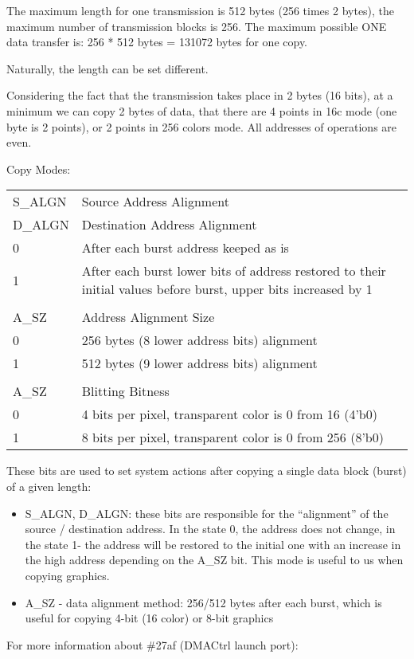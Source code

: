The maximum length for one transmission is 512 bytes (256 times 2
bytes), the maximum number of transmission blocks is 256. The maximum
possible ONE data transfer is: 256 * 512 bytes = 131072 bytes for one
copy.

Naturally, the length can be set different.

Considering the fact that the transmission takes place in 2 bytes (16
bits), at a minimum we can copy 2 bytes of data, that there are 4
points in 16c mode (one byte is 2 points), or 2 points in 256 colors
mode. All addresses of operations are even.

Copy Modes:
\begin{table}
\begin{tabular}{lp{4in}}
S\_ALGN & Source Address Alignment\\
D\_ALGN & Destination Address Alignment\\
0 & After each burst address keeped as is\\
1 & After each burst lower bits of address restored to their initial
values before burst, upper bits increased by 1\\
&\\
A\_SZ & Address Alignment Size\\
0 & 256 bytes (8 lower address bits) alignment\\
1 & 512 bytes (9 lower address bits) alignment\\
&\\
A\_SZ & Blitting Bitness\\
0 & 4 bits per pixel, transparent color is 0 from 16 (4'b0)\\
1 & 8 bits per pixel, transparent color is 0 from 256 (8'b0)\\
\end{tabular}
\end{table}
These bits are used to set system actions after copying a single data
block (burst) of a given length:
\begin{itemize}
\item S\_ALGN, D\_ALGN: these bits are responsible for the “alignment”
  of the source / destination address. In the state 0, the address
  does not change, in the state 1- the address will be restored to the
  initial one with an increase in the high address depending on the
  A\_SZ bit. This mode is useful to us when copying graphics.
\item A\_SZ - data alignment method: 256/512 bytes after each burst,
  which is useful for copying 4-bit (16 color) or 8-bit graphics
\end{itemize}
For more information about \#27af (DMACtrl launch port):

